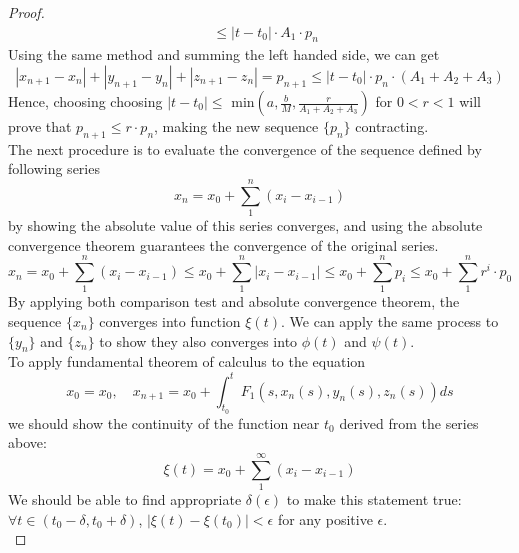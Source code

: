 \documentclass[a4paper,10pt]{article}
\begin{document}
\begin{proof}
\begin{align*}
            &\leq |t - t_0| \cdot A_1 \cdot p_{n}
        \end{align*}
        Using the same method and summing the left handed side, we can get
        \begin{displaymath}
            |x_{n+1} - x_n| + |y_{n+1} -y_n| + |z_{n+1} - z_n| = p_{n+1} \leq |t- t_0| \cdot p_n \cdot (A_1 + A_2 + A_3)
        \end{displaymath}
        Hence, choosing choosing $|t - t_0| \leq$ min$(a, \frac{b}{M}, \frac{r}{A_1 + A_2 + A_3})$ for $0 < r < 1$ will prove that $p_{n+1} \leq r \cdot p_n$, making the new sequence $\{ p_n \}$ contracting. \\
        The next procedure is to evaluate the convergence of the sequence defined by following series
        \begin{displaymath}
            x_n = x_0 + \sum_{1}^{n} (x_i - x_{i-1})
        \end{displaymath}
        by showing the absolute value of this series converges, and using the absolute convergence theorem guarantees the convergence of the original series.
        \begin{displaymath}
            x_n = x_0 + \sum_{1}^{n} (x_i - x_{i-1}) \leq x_0 + \sum_{1}^{n} |x_i - x_{i-1}| \leq x_0 + \sum_{1}^{n} p_i \leq x_0 + \sum_{1}^{n} r^i \cdot p_0
        \end{displaymath}
        By applying both comparison test and absolute convergence theorem, the sequence $\{ x_n \}$ converges into function $\xi(t)$. We can apply the same process to $\{ y_n \}$ and $\{ z_n \}$ to show they also converges into $\phi(t)$ and $\psi(t)$.\\ \newline
        To apply fundamental theorem of calculus to the equation
        \begin{displaymath}
            x_0 = x_0, \quad x_{n+1} = x_0 + \int_{t_0}^{t} F_1(s, x_n(s), y_n(s), z_n(s)) ds
        \end{displaymath}
        we should show the continuity of the function near $t_0$ derived from the series above:
        \begin{displaymath}
            \xi(t) = x_0 + \sum_{1}^{\infty} (x_i - x_{i-1})
        \end{displaymath}
        We should be able to find appropriate $\delta(\epsilon)$ to make this statement true: $\forall t \in (t_0 - \delta, t_0 + \delta)$, $|\xi(t) - \xi(t_0)| < \epsilon$ for any positive $\epsilon$. 
        \begin{displaymath}

\end{displaymath}
\end{proof}
\end{document}
